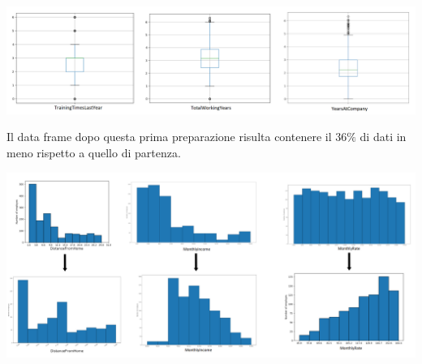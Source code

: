 \documentclass[a4paper,9pt]{article}
\begin{document}
\begin{center}
\includegraphics[scale=1]{boxplot.png}
\end{center}
 Il data frame dopo questa prima preparazione risulta contenere il $36\%$ di dati in meno rispetto a quello di partenza.\\

\begin{center}
\includegraphics[scale=0.35]{trasformer.png}
\end{center}
\end{document}
